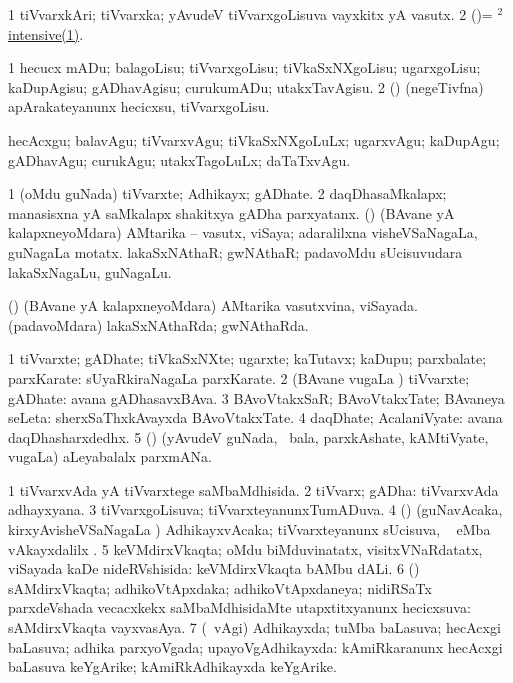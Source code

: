 \bentry
{}
\gl{\nA}
\bmng
\bnum
\num{1} tiVvarxkAri; tiVvarxka; yAvudeV tiVvarxgoLisuva vayxkitx yA vasutx. 
\num{2} (\vAyx)= \hyperlink{intensive(2)}{$^2$intensive(1)}. 
\enum
\emng
\eentry

\bentry
{}
\gl{\sakirx}
\bmng
\bnum
\num{1} hecucx mADu; balagoLisu; tiVvarxgoLisu; tiVkaSxNXgoLisu; ugarxgoLisu; kaDupAgisu; gADhavAgisu; curukumADu; utakxTavAgisu. 
\num{2} (\CA) (negeTivfna) apArakateyanunx hecicxsu, tiVvarxgoLisu. 
\enum
\emng

\noindent 
\gl{\akirx}
\bmng
hecAcxgu; balavAgu; tiVvarxvAgu; tiVkaSxNXgoLuLx; ugarxvAgu; kaDupAgu; gADhavAgu; curukAgu; utakxTagoLuLx; daTaTxvAgu. 
\emng
\eentry

\bentry
{}
\gl{\nA}
\bmng
\bnum
\num{1} (oMdu guNada) tiVvarxte; Adhikayx; gADhate. 
\num{2} daqDhasaMkalapx; manasisxna yA saMkalapx shakitxya gADha parxyatanx. 
 (\takaR) 
\banum
{} (BAvane yA kalapxneyoMdara) AMtarika -- vasutx, viSaya; adaralilxna visheVSaNagaLa, guNagaLa motatx. 
 lakaSxNAthaR; gwNAthaR; padavoMdu sUcisuvudara lakaSxNagaLu, guNagaLu. 
\eanum
\numie
\enum
\emng
\eentry

\bentry
{}
\gl{\gu}
\bmng
(\takaR) 
\banum
{} (BAvane yA kalapxneyoMdara) AMtarika vasutxvina, viSayada. 
 (padavoMdara) lakaSxNAthaRda; gwNAthaRda. 
\eanum
\emng
\eentry

\bentry
{}
\gl{\nA}
\bmng
\bnum
\num{1} tiVvarxte; gADhate; tiVkaSxNXte; ugarxte; kaTutavx; kaDupu; parxbalate; parxKarate:  sUyaRkiraNagaLa parxKarate. 
\num{2} (BAvane \mo vugaLa \vi) tiVvarxte; gADhate:  avana gADhasavxBAva. 
\num{3} BAvoVtakxSaR; BAvoVtakxTate; BAvaneya seLeta:  sherxSaThxkAvayxda BAvoVtakxTate. 
\num{4} daqDhate; AcalaniVyate:  avana daqDhasharxdedhx. 
\num{5} (\Bwvi) (yAvudeV guNada, \udA\ bala, parxkAshate, kAMtiVyate, \mo vugaLa) aLeyabalalx parxmANa. 
\enum
\emng
\eentry

\bentry
{}
\gl{\gu}
\bmng
\bnum
\num{1} tiVvarxvAda yA tiVvarxtege saMbaMdhisida. 
\num{2} tiVvarx; gADha:  tiVvarxvAda adhayxyana. 
\num{3} tiVvarxgoLisuva; tiVvarxteyanunxTumADuva. 
\num{4} (\vAyx) (guNavAcaka, kirxyAvisheVSaNagaLa \vi) AdhikayxvAcaka; tiVvarxteyanunx sUcisuva, \udA\  eMba vAkayxdalilx . 
\num{5} keVMdirxVkaqta; oMdu biMduvinatatx, visitxVNaRdatatx, viSayada kaDe nideRVshisida:  keVMdirxVkaqta bAMbu dALi. 
\num{6} (\athaRshA) sAMdirxVkaqta; adhikoVtApxdaka; adhikoVtApxdaneya; nidiRSaTx parxdeVshada vecacxkekx saMbaMdhisidaMte utapxtitxyanunx hecicxsuva:  sAMdirxVkaqta vayxvasAya. 
\num{7} (\sA\ \sapUpa vAgi) Adhikayxda; tuMba baLasuva; hecAcxgi baLasuva; adhika parxyoVgada; upayoVgAdhikayxda:  kAmiRkaranunx hecAcxgi baLasuva keYgArike; kAmiRkAdhikayxda keYgArike. 
\enum
\emng
\eentry

